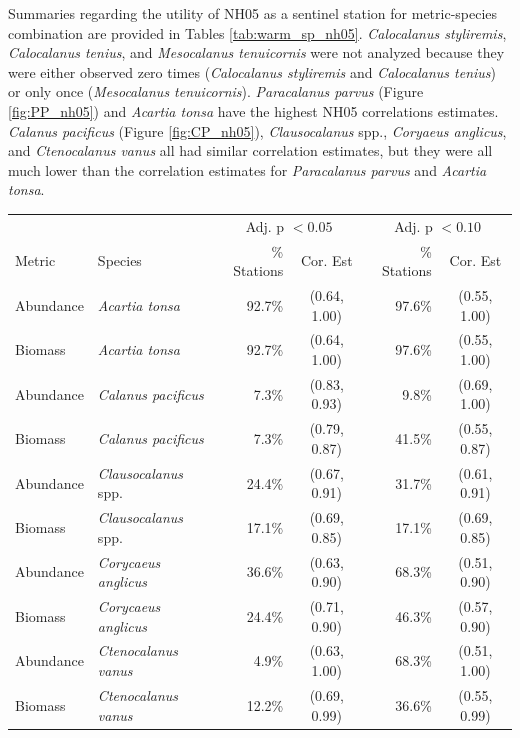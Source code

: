\documentclass[preprint, authoryear, 12pt]{elsarticle}
\begin{document}
Summaries regarding the utility of NH05 as a sentinel station for metric-species combination are provided in Tables \ref{tab:warm_sp_nh05}. \textit{Calocalanus styliremis}, \textit{Calocalanus tenius}, and \textit{Mesocalanus tenuicornis} were not analyzed because they were either observed zero times (\textit{Calocalanus styliremis} and \textit{Calocalanus tenius}) or only once (\textit{Mesocalanus tenuicornis}). \textit{Paracalanus parvus} (Figure \ref{fig:PP_nh05}) and \textit{Acartia tonsa} have the highest NH05 correlations estimates. \textit{Calanus pacificus} (Figure \ref{fig:CP_nh05}), \textit{Clausocalanus} spp., \textit{Coryaeus anglicus}, and \textit{Ctenocalanus vanus} all had similar correlation estimates, but they were all much lower than the correlation estimates for \textit{Paracalanus parvus} and \textit{Acartia tonsa}. 
\begin{table}[ht]
    \footnotesize
    \centering
    \begin{tabular}{llrcrc}
    \hline
    \hline
           & & \multicolumn{2}{c}{Adj. p $< 0.05$} & \multicolumn{2}{c}{Adj. p $< 0.10$} \\
         Metric & Species  & \% Stations & Cor. Est & \% Stations & Cor. Est \\
         \hline
         Abundance & \textit{Acartia tonsa}  & 92.7\% &  (0.64, 1.00) & 97.6\% & (0.55, 1.00) \\
         Biomass & \textit{Acartia tonsa}  & 92.7\% &  (0.64, 1.00) & 97.6\% & (0.55, 1.00) \\
         Abundance & \textit{Calanus pacificus}  & 7.3\% &  (0.83, 0.93) & 9.8\% & (0.69, 1.00) \\
         Biomass & \textit{Calanus pacificus}  & 7.3\% &  (0.79, 0.87) & 41.5\% & (0.55, 0.87) \\
         Abundance & \textit{Clausocalanus} spp.  & 24.4\% &  (0.67, 0.91) & 31.7\% & (0.61, 0.91) \\
         Biomass & \textit{Clausocalanus} spp. & 17.1\% &  (0.69, 0.85) & 17.1\% & (0.69, 0.85) \\
         Abundance & \textit{Corycaeus anglicus}  & 36.6\% &  (0.63, 0.90) & 68.3\% & (0.51, 0.90) \\
         Biomass & \textit{Corycaeus anglicus}  & 24.4\% &  (0.71, 0.90) & 46.3\% & (0.57, 0.90) \\
         Abundance & \textit{Ctenocalanus vanus}  & 4.9\% &  (0.63, 1.00) & 68.3\% & (0.51, 1.00) \\
         Biomass & \textit{Ctenocalanus vanus}  & 12.2\% &  (0.69, 0.99) & 36.6\% & (0.55, 0.99) \\

\end{tabular}
\end{table}
\end{document}
